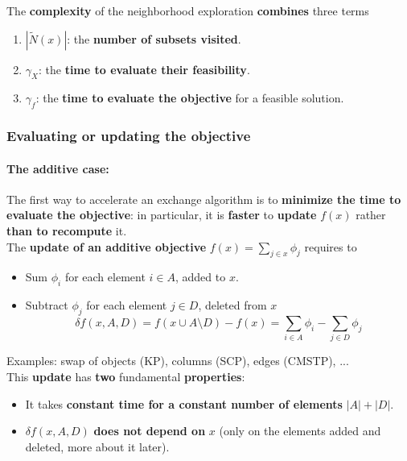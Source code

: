 The \textbf{complexity} of the neighborhood exploration \textbf{combines} three terms
\begin{enumerate}
	\item $| \tilde{N} (x) |$: the \textbf{number of subsets visited}.\\
	
	\item $\gamma_X$: the \textbf{time to evaluate their feasibility}.\\
	
	\item $\gamma_f$: the \textbf{time to evaluate the objective} for a feasible solution.\\
\end{enumerate}

\newpage

\subsubsection{Evaluating or updating the objective}

\paragraph{The additive case:} The first way to accelerate an exchange algorithm is to \textbf{minimize the time to evaluate the objective}: in particular, it is \textbf{faster} to \textbf{update} $f (x)$ rather \textbf{than to recompute} it.\\

The \textbf{update of an additive objective} $f (x) = \sum_{j \in x} \phi_j$ requires to
\begin{itemize}
	\item Sum $\phi_i$ for each element $i \in A$, added to $x$.\\
	
	\item Subtract $\phi_j$ for each element $j \in D$, deleted from $x$
	$$ \delta f (x, A, D) = f (x \cup A \setminus D) - f(x) = \sum_{i \in A} \phi_i - \sum_{j \in D} \phi_j $$
	\nn
\end{itemize}

Examples: swap of objects (KP), columns (SCP), edges (CMSTP), ...\\

This \textbf{update} has \textbf{two} fundamental \textbf{properties}:
\begin{itemize}
	\item It takes \textbf{constant time for a constant number of elements} $|A| + |D|$.\\
	
	\item $\delta f (x, A, D)$ \textbf{does not depend on} $x$ (only on the elements added and deleted, more about it later).\\
\end{itemize}

